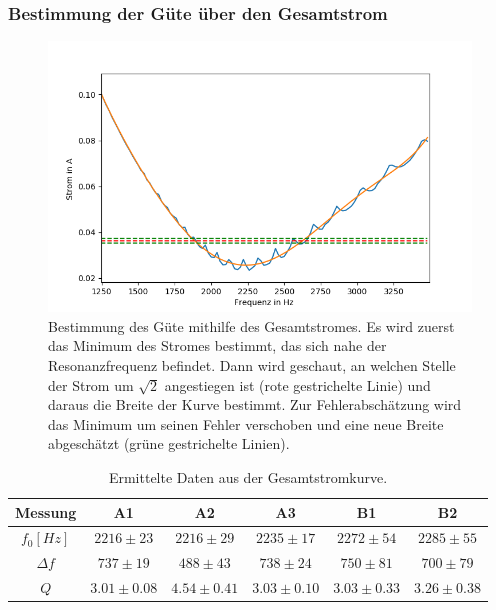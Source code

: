 \documentclass[12pt,a4paper]{article}
\begin{document}
\subsubsection{Bestimmung der Güte über den Gesamtstrom}
\begin{figure}
\centering
\includegraphics[scale=0.8]{Bilder/Parallel_Iges.png}
\caption{Bestimmung des Güte mithilfe des Gesamtstromes. Es wird zuerst das Minimum des Stromes bestimmt, das sich nahe der Resonanzfrequenz befindet. Dann wird geschaut, an welchen Stelle der Strom um $\sqrt{2}$ angestiegen ist (rote gestrichelte Linie) und daraus die Breite der Kurve bestimmt. Zur Fehlerabschätzung wird das Minimum um seinen Fehler verschoben und eine neue Breite abgeschätzt (grüne gestrichelte Linien). }
\label{fig:parallel_Iges}
\end{figure}

\begin{table}
\centering
\begin{tabular}{|c|c|c|c||c|c|}
\hline
Messung & A1 & A2 & A3 & B1 & B2\\
\hline
$f_0[Hz]$ & $2216\pm 23 $ & $2216\pm 29 $ & $2235\pm 17$ & $2272\pm 54$ & $2285\pm 55$\\
\hline
$\Delta f$ & $737\pm 19 $ & $488\pm 43 $ & $738\pm 24$ & $750\pm 81$ & $700\pm 79$\\
\hline
$Q$ & $3.01\pm 0.08 $ & $4.54\pm 0.41 $ & $3.03\pm 0.10$ & $3.03\pm 0.33$ & $3.26\pm 0.38$\\
\hline
\end{tabular}
\caption{Ermittelte Daten aus der Gesamtstromkurve.}
\label{tab:parallel_methode1}
\end{table}
\end{document}
